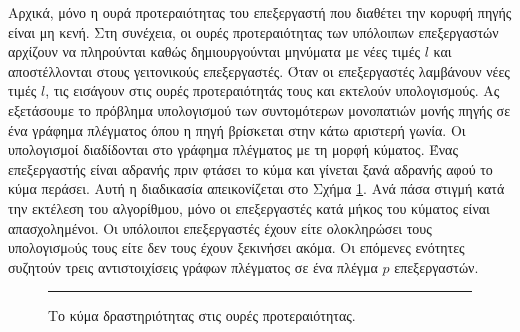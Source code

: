 \documentclass[12pt,a4paper]{article}
\begin{document}
Αρχικά, μόνο η ουρά προτεραιότητας του επεξεργαστή που διαθέτει την
κορυφή πηγής είναι μη κενή. Στη συνέχεια, οι ουρές προτεραιότητας των
υπόλοιπων επεξεργαστών αρχίζουν να πληρούνται καθώς δημιουργούνται
μηνύματα με νέες τιμές $l$ και αποστέλλονται στους γειτονικούς
επεξεργαστές. Όταν οι επεξεργαστές λαμβάνουν νέες τιμές $l$, τις
εισάγουν στις ουρές προτεραιότητάς τους και εκτελούν υπολογισμούς.
Ας εξετάσουμε το πρόβλημα υπολογισμού των συντομότερων μονοπατιών
μονής πηγής σε ένα γράφημα πλέγματος όπου η πηγή βρίσκεται στην κάτω αριστερή γωνία. Οι υπολογισμοί διαδίδονται στο
γράφημα πλέγματος με τη μορφή κύματος. Ένας επεξεργαστής είναι αδρανής
πριν φτάσει το κύμα και γίνεται ξανά αδρανής αφού το κύμα περάσει.
Αυτή η διαδικασία απεικονίζεται στο Σχήμα \ref{fig:graph18}. Ανά πάσα στιγμή κατά
την εκτέλεση του αλγορίθμου, μόνο οι επεξεργαστές κατά μήκος του
κύματος είναι απασχολημένοι. Οι υπόλοιποι επεξεργαστές έχουν είτε
ολοκληρώσει τους υπολογισμoύς τους είτε δεν τους έχουν ξεκινήσει ακόμα.
Οι επόμενες ενότητες συζητούν τρεις αντιστοιχίσεις γράφων πλέγματος
σε ένα πλέγμα $p$ επεξεργαστών.
\vspace{0.3cm}
\begin{figure}[H]
\centering
{}
\noindent\rule{\textwidth}{0.2pt}
\caption{Το κύμα δραστηριότητας στις ουρές προτεραιότητας.}
\label{fig:graph18}
\end{figure}
\end{document}

